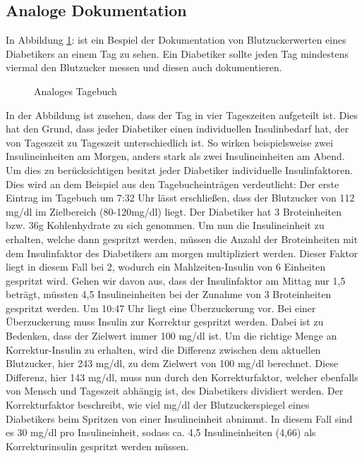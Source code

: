 \documentclass[a4paper,11pt]{article}%
\renewcommand{\\}{\vspace*{0.5\baselineskip} \newline}
\begin{document}
	\subsection{Analoge Dokumentation}
		In Abbildung \ref{img:tagebuch}:  ist ein Bespiel der Dokumentation von Blutzuckerwerten eines Diabetikers an einem Tag zu sehen. Ein Diabetiker sollte jeden Tag mindestens viermal den Blutzucker messen und diesen auch dokumentieren.
		\begin{figure}[H]
			\centering
			\setlength{\fboxsep}{1pt}
			\setlength{\fboxrule}{1pt}
			\captionsetup{justification=centering}
			\caption{Analoges Tagebuch}
			\label{img:tagebuch}
		\end{figure}
		In der Abbildung ist zusehen, dass der Tag in vier Tageszeiten aufgeteilt ist. Dies hat den Grund, dass jeder Diabetiker einen individuellen Insulinbedarf hat, der von Tageszeit zu Tageszeit unterschiedlich ist. So wirken beispielsweise zwei Insulineinheiten am Morgen, anders stark als zwei Insulineinheiten am Abend. Um dies zu berücksichtigen besitzt jeder Diabetiker individuelle Insulinfaktoren. Dies wird an dem Beispiel aus den Tagebucheinträgen verdeutlicht:\\
		Der erste Eintrag im Tagebuch um 7:32 Uhr lässt erschließen, dass der Blutzucker von 112 mg/dl im Zielbereich (80-120mg/dl) liegt. Der Diabetiker hat 3 Broteinheiten bzw. 36g Kohlenhydrate zu sich genommen. Um nun die Insulineinheit zu erhalten, welche dann gespritzt werden, müssen die Anzahl der Broteinheiten mit dem Insulinfaktor des Diabetikers am morgen multipliziert werden. Dieser Faktor liegt in diesem Fall bei 2, wodurch ein Mahlzeiten-Insulin von 6 Einheiten gespritzt wird.\newline
		Gehen wir davon aus, dass der Insulinfaktor am Mittag nur 1,5 beträgt, müssten 4,5 Insulineinheiten bei der Zunahme von 3 Broteinheiten gespritzt werden.\newline
		Um 10:47 Uhr liegt eine Überzuckerung vor. Bei einer Überzuckerung muss Insulin zur Korrektur gespritzt werden. Dabei ist zu Bedenken, dass der Zielwert immer 100 mg/dl ist. Um die richtige Menge an Korrektur-Insulin zu erhalten, wird die Differenz zwischen dem aktuellen Blutzucker, hier 243 mg/dl, zu dem Zielwert von 100 mg/dl berechnet. Diese Differenz, hier 143 mg/dl, muss nun durch den Korrekturfaktor, welcher ebenfalls von Mensch und Tageszeit abhängig ist, des Diabetikers dividiert werden. Der Korrekturfaktor beschreibt, wie viel mg/dl der Blutzuckerspiegel eines Diabetikers beim Spritzen von einer Insulineinheit abnimmt. In diesem Fall sind es 30 mg/dl pro Insulineinheit, sodass ca. 4,5 Insulineinheiten (4,66) als Korrekturinsulin gespritzt werden müssen.\newline
\end{document}
